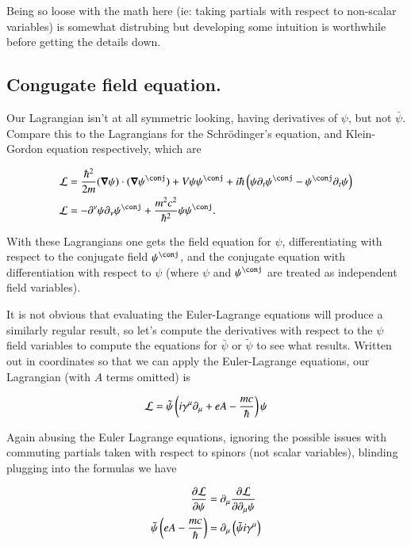 \documentclass{article}
\begin{document}
Being so loose with the math here (ie: taking partials with respect to non-scalar variables) is somewhat distrubing but developing some intuition is worthwhile before getting the details down.

\subsection{ Congugate field equation. }

Our Lagrangian isn't at all symmetric looking, having derivatives of $\psi$, but not $\bar\psi$.  Compare this to the Lagrangians for the 
Schr\"{o}dinger's equation, and Klein-Gordon equation respectively, which are

\begin{align}
\LL &= \frac{\hbar^2}{2m}
(\spacegrad \psi) \cdot (\spacegrad \psi^\conj) + V \psi \psi^\conj + {i \hbar} \left( \psi \partial_t \psi^\conj - \psi^\conj \partial_t \psi \right) \\
\LL &= -\partial^\nu \psi \partial_\nu \psi^\conj + \frac{m^2 c^2}{\hbar^2} \psi \psi^\conj.
\end{align}

With these Lagrangians one gets the field equation for $\psi$, differentiating with respect to the conjugate field $\psi^\conj$, and the conjugate equation with differentiation with respect to $\psi$ (where $\psi$ and $\psi^\conj$ are treated as independent field variables).

It is not obvious that evaluating the Euler-Lagrange equations will produce a similarly regular result, so
let's compute the derivatives with respect to the $\psi$ field variables to compute the equations for $\bar \psi$ or $\tilde{\psi}$ to see what results.  Written out in coordinates so that we can apply the Euler-Lagrange equations, our Lagrangian (with $A$ terms omitted) is

\begin{align}\label{eqn:lag4}
\mathcal{L} = \tilde{\psi}\left( i \gamma^\mu \partial_\mu + e A - \frac{m c}{\hbar} \right) \psi
\end{align}

Again abusing the Euler Lagrange equations, ignoring the possible issues with commuting partials taken
with respect to spinors (not scalar variables), blinding plugging into the formulas we have

\begin{align*}
\frac{\partial {\mathcal{L}}}{\partial {\psi}} &= \partial_\mu \frac{\partial {\mathcal{L}}}{\partial {\partial_\mu \psi}} \\
\tilde{\psi}\left( e A - \frac{m c}{\hbar} \right) &= \partial_\mu \left(\tilde{\psi} i \gamma^\mu \right)
\end{align*}
\end{document}
